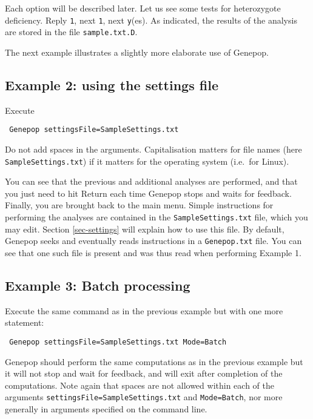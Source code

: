 \documentclass[12pt,]{book}
\begin{document}
Each option will be described later. Let us see some tests for
heterozygote deficiency. Reply \texttt{1}, next \texttt{1}, next
\texttt{y}(es). As indicated, the results of the analysis are stored in
the file \texttt{sample.txt.D}.

The next example illustrates a slightly more elaborate use of Genepop.

\subsection{Example 2: using the settings
file}\label{example-2-using-the-settings-file}

Execute

\begin{verbatim}
 Genepop settingsFile=SampleSettings.txt
\end{verbatim}

Do not add spaces in the arguments.
Capitalisation matters for file names (here \texttt{SampleSettings.txt})
if it matters for the operating system (i.e.~for Linux).

You can see that the previous and additional analyses are performed, and
that you just need to hit Return each time Genepop stops and waits for
feedback. Finally, you are brought back to the main menu. Simple
instructions for performing the analyses are contained in the
\texttt{SampleSettings.txt} file, which you may edit. Section
\ref{sec-settings} will explain how to use this file. By default,
Genepop seeks and eventually reads instructions in a
\texttt{Genepop.txt} file. You can see that one such file is present and
was thus read when performing Example 1.

\subsection{Example 3: Batch
processing}\label{example-3-batch-processing}

Execute the same command as in the previous example but with one more
statement:

\begin{verbatim}
 Genepop settingsFile=SampleSettings.txt Mode=Batch
\end{verbatim}

 Genepop should perform the same
computations as in the previous example but it will not stop and wait
for feedback, and will exit after completion of the computations. Note
again that spaces are not allowed within each of the arguments
\texttt{settingsFile=SampleSettings.txt} and \texttt{Mode=Batch}, nor
more generally in arguments specified on the command line.
\end{document}
